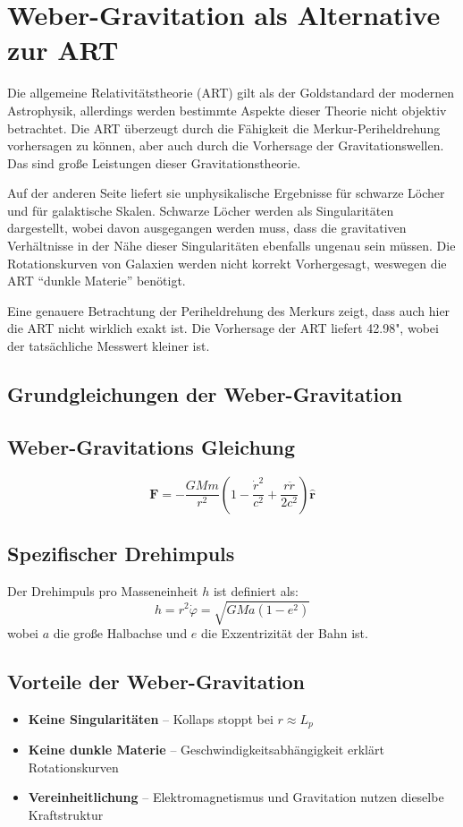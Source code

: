 \newpage
\section{Weber-Gravitation als Alternative zur ART}
Die allgemeine Relativitätstheorie (ART) gilt als der Goldstandard der modernen Astrophysik, allerdings werden bestimmte Aspekte dieser Theorie
nicht objektiv betrachtet. Die ART überzeugt durch die Fähigkeit die Merkur-Periheldrehung vorhersagen zu können, aber auch durch die Vorhersage
der Gravitationswellen. Das sind große Leistungen dieser Gravitationstheorie.

Auf der anderen Seite liefert sie unphysikalische Ergebnisse für schwarze Löcher und für galaktische Skalen. Schwarze Löcher werden als Singularitäten
dargestellt, wobei davon ausgegangen werden muss, dass die gravitativen Verhältnisse in der Nähe dieser Singularitäten ebenfalls ungenau sein müssen. Die
Rotationskurven von Galaxien werden nicht korrekt Vorhergesagt, weswegen die ART \enquote{dunkle Materie} benötigt.

Eine genauere Betrachtung der Periheldrehung des Merkurs zeigt, dass auch hier die ART nicht wirklich exakt ist. Die Vorhersage der ART liefert 42.98", wobei
der tatsächliche Messwert kleiner ist.

\subsection{Grundgleichungen der Weber-Gravitation}
\subsection*{Weber-Gravitations Gleichung}
\begin{equation}\label{eq:weber_gravitationskraft}
\mathbf{F} = -\frac{GMm}{r^2}\left(1 - \frac{\dot{r}^2}{c^2} + \frac{r\ddot{r}}{2c^2}\right)\mathbf{\hat{r}}
\end{equation}

\subsection*{Spezifischer Drehimpuls}
Der Drehimpuls pro Masseneinheit $h$ ist definiert als:
\begin{equation}
h = r^2\dot{\varphi} = \sqrt{GMa(1-e^2)}
\end{equation}
wobei $a$ die große Halbachse und $e$ die Exzentrizität der Bahn ist.

\subsection{Vorteile der Weber-Gravitation}
\begin{itemize}
\item \textbf{Keine Singularitäten} – Kollaps stoppt bei $r \approx L_p$
\item \textbf{Keine dunkle Materie} – Geschwindigkeitsabhängigkeit erklärt Rotationskurven
\item \textbf{Vereinheitlichung} – Elektromagnetismus und Gravitation nutzen dieselbe Kraftstruktur
\end{itemize}

